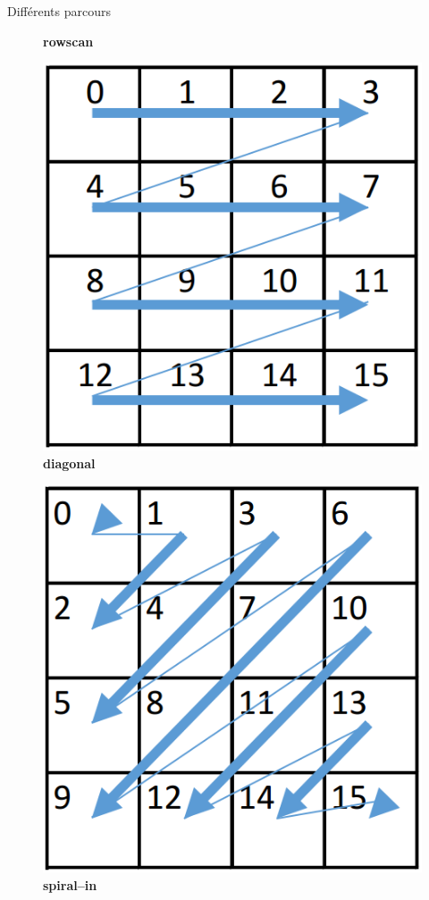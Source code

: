 	\begin{frame}[plain]{Différents parcours}
			\begin{figure}[H]
				\textbf{rowscan}
				
				\includegraphics[width=\linewidth]{images/parcours_rowscan.png}
				\endminipage\hfill
				\textbf{diagonal}
								
				\includegraphics[width=\linewidth]{images/parcours_diagonal.png}
				\endminipage\hfill
				\textbf{spiral--in}
				

\end{figure}
\end{frame}
